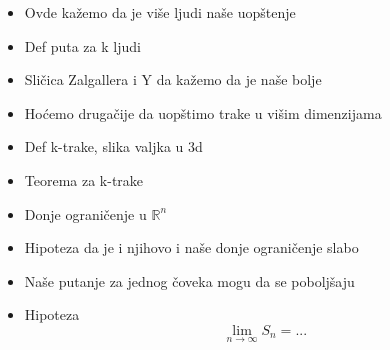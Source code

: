\documentclass[b1paper,portrait]{template/baposter}
\begin{document}
\begin{poster}
{
	\begin{itemize}
		\item Ovde ka\v zemo da je vi\v se ljudi na\v se uop\v stenje
		\item Def puta za k ljudi
		\item Sli\v cica Zalgallera i Y da ka\v zemo da je na\v se bolje
	\end{itemize}
	\vspace{0.15cm}
}


{
	\begin{itemize}
		\item Ho\' cemo druga\v cije da uop\v stimo trake u vi\v sim dimenzijama
		\item Def k-trake, slika valjka u 3d
		\item Teorema za k-trake
	\end{itemize}
	\vspace{0.15cm}
}


{
	\begin{itemize}
		\item Donje ograni\v cenje u $\mathbb{R}^n$
		\item Hipoteza da je i njihovo i na\v se donje ograni\v cenje slabo
	\end{itemize}
	\vspace{0.15cm}
}

{
	\begin{itemize}
		\item Na\v se putanje za jednog \v coveka mogu da se pobolj\v saju
		\item Hipoteza $$\lim_{n \to \infty}S_n = ...$$
	\end{itemize}
	\vspace{0.15cm}
}

\end{poster}
\end{document}
